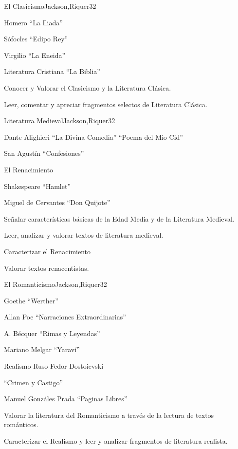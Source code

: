 \begin{syllabus}
\begin{unit}{El Clasicismo}{Jackson,Riquer}{3}{2}
\begin{topics}
	\item Homero ``La Iliada''
	\item Sófocles ``Edipo Rey''
	\item Virgilio ``La Eneida''
	\item Literatura Cristiana ``La Biblia''
\end{topics}
\begin{unitgoals}
	\item Conocer y Valorar el Clasicismo y la Literatura Clásica.
	\item Leer, comentar y apreciar fragmentos selectos de Literatura Clásica.
\end{unitgoals}
\end{unit}
\begin{unit}{Literatura Medieval}{Jackson,Riquer}{3}{2}
\begin{topics}
	\item Dante Alighieri ``La Divina Comedia'' ``Poema del Mio Cid''
	\item    San Agustín ``Confesiones''  
	\item    El Renacimiento
	\item    Shakespeare ``Hamlet''
	\item    Miguel de Cervantes ``Don Quijote''
\end{topics}
\begin{unitgoals}
	\item Señalar características básicas de la Edad Media y de la Literatura Medieval.
	\item Leer, analizar y valorar textos de literatura medieval.
	\item Caracterizar el Renacimiento
	\item Valorar textos renacentistas.
\end{unitgoals}
\end{unit}

\begin{unit}{El Romanticismo}{Jackson,Riquer}{3}{2}
\begin{topics}
	\item Goethe ``Werther''
	\item Allan Poe ``Narraciones Extraordinarias''
	\item A. Bécquer ``Rimas y Leyendas''
	\item Mariano Melgar ``Yaraví''
	\item Realismo Ruso Fedor Dostoievski 
	\item ``Crimen y Castigo''
	\item Manuel Gonzáles Prada ``Paginas Libres''
\end{topics}
\begin{unitgoals}
	\item Valorar la literatura del Romanticismo a través de la lectura de textos románticos.
	\item Caracterizar el Realismo y leer y analizar fragmentos de literatura realista.
\end{unitgoals}
\end{unit}


\end{syllabus}
